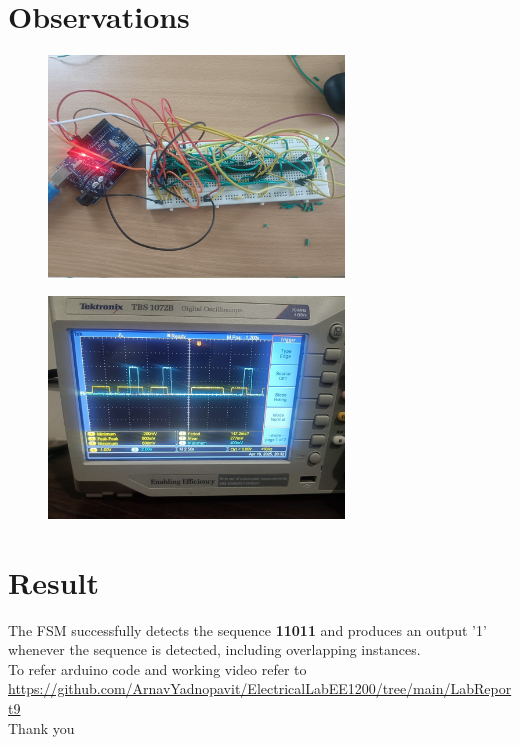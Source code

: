\documentclass[12pt]{article}
\begin{document}
\section*{Observations}
\begin{figure}[H]
    \centering
    \includegraphics[width=0.7\textwidth]{figs/circuit.jpeg}
\end{figure}
\begin{figure}[H]
    \centering
    \includegraphics[width=0.7\textwidth]{figs/plot.jpeg}
\end{figure}
\section*{Result}
The FSM successfully detects the sequence \textbf{11011} and produces an output '1' whenever the sequence is detected, including overlapping instances.\\
To refer arduino code and working video refer to \\
    \url{https://github.com/ArnavYadnopavit/ElectricalLabEE1200/tree/main/LabReport9}\\
    
 \centering
 Thank you
\end{document}
